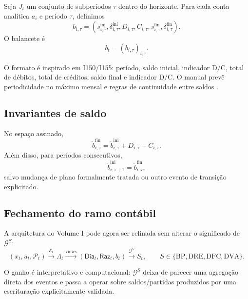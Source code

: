 \documentclass[11pt,a4paper]{article}
\newcommand{\BP}{\mathrm{BP}}
\newcommand{\DRE}{\mathrm{DRE}}
\newcommand{\DFC}{\mathrm{DFC}}
\newcommand{\DVA}{\mathrm{DVA}}
\newcommand{\cG}{\mathcal{G}}
\newcommand{\Plano}{\mathcal{P}}
\newcommand{\cE}{\mathcal{E}}
\newcommand{\Dia}{\mathsf{Dia}}
\newcommand{\Raz}{\mathsf{Raz}}
\begin{document}
Seja $J_t$ um conjunto de subperíodos $\tau$ dentro do horizonte. Para cada conta analítica $a_i$ e período $\tau$, definimos
\begin{equation}
\boxed{
 b_{i,\tau}
=
(s^{\mathrm{ini}}_{i,\tau},\delta^{\mathrm{ini}}_{i,\tau},
D_{i,\tau},C_{i,\tau},
 s^{\mathrm{fin}}_{i,\tau},\delta^{\mathrm{fin}}_{i,\tau}).
}
\label{eq:trial-balance-row}
\end{equation}
O balancete é
\begin{equation}
\boxed{b_t=(b_{i,\tau})_{i,\tau}.}
\end{equation}

O formato é inspirado em I150/I155: período, saldo inicial, indicador D/C, total de débitos, total de créditos, saldo final e indicador D/C. O manual prevê periodicidade no máximo mensal e regras de continuidade entre saldos \cite{ECD2026}.

\subsection{Invariantes de saldo}

No espaço assinado,
\begin{equation}
\boxed{
\widetilde b_{i,\tau}^{\mathrm{fin}}
=
\widetilde b_{i,\tau}^{\mathrm{ini}}
+D_{i,\tau}-C_{i,\tau}.
}
\label{eq:trial-balance-invariant}
\end{equation}
Além disso, para períodos consecutivos,
\begin{equation}
\boxed{
\widetilde b_{i,\tau+1}^{\mathrm{ini}}
=
\widetilde b_{i,\tau}^{\mathrm{fin}},
}
\label{eq:continuity}
\end{equation}
salvo mudança de plano formalmente tratada ou outro evento de transição explicitado.

\subsection{Fechamento do ramo contábil}

A arquitetura do Volume I pode agora ser refinada sem alterar o significado de $\cG^S$:
\begin{equation}
\boxed{
(x_t,u_t,\Plano_t)
\xrightarrow{\cE_t}
\Lambda_t
\xrightarrow{\mathrm{views}}
(\Dia_t,\Raz_t,b_t)
\xrightarrow{\cG^S}
S_t,
\qquad S\in\{\BP,\DRE,\DFC,\DVA\}.
}
\label{eq:accounting-final}
\end{equation}

O ganho é interpretativo e computacional: $\cG^S$ deixa de parecer uma agregação direta dos eventos e passa a operar sobre saldos/partidas produzidos por uma escrituração explicitamente validada.
\end{document}
